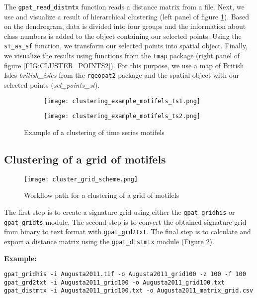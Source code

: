 The {\tt gpat\_read\_distmtx} function reads a distance matrix from a file. 
Next, we use and visualize a result of hierarchical clustering (left panel of figure \ref{FIG:CLUSTER_POINTSTS2}).
Based on the dendrogram, data is divided into four groups and the information about class numbers is added to the object containing our selected points.
Using the {\tt st\_as\_sf} function, we transform our selected points into spatial object.
Finally, we visualize the results using functions from the {\tt tmap} package (right panel of figure \ref{FIG:CLUSTER_POINTS2}).
For this purpose, we use a map of British Isles {\it british\_isles} from the {\tt rgeopat2} package and the spatial object with our selected points ({\it sel\_points\_st}).

\begin{figure}[H]
  \begin{subfigure}[b]{0.5\textwidth}
    \texttt{[image: clustering\_example\_motifels\_ts1.png]}
  \end{subfigure}
  \begin{subfigure}[b]{0.5\textwidth}
    \texttt{[image: clustering\_example\_motifels\_ts2.png]}
  \end{subfigure}
  \caption{Example of a clustering of time series motifels}
  \label{FIG:CLUSTER_POINTSTS2}
\end{figure}

\FloatBarrier

\subsection{Clustering of a grid of motifels}

\begin{figure}[H]
	\centering
	\texttt{[image: cluster\_grid\_scheme.png]}
	\caption{Workflow path for a clustering of a grid of motifels}
	\label{FIG:CLUSTER_GRID}
\end{figure}

The first step is to create a signature grid using either the {\tt gpat\_gridhis} or {\tt gpat\_gridts} module.
The second step is to convert the obtained signature grid from binary to text format with {\tt gpat\_grd2txt}.
The final step is to calculate and export a distance matrix using the {\tt gpat\_distmtx} module (Figure \ref{FIG:CLUSTER_GRID}).

{\bf Example:}

\begin{minipage}{\linewidth}
\begin{lstlisting}
gpat_gridhis -i Augusta2011.tif -o Augusta2011_grid100 -z 100 -f 100
gpat_grd2txt -i Augusta2011_grid100 -o Augusta2011_grid100.txt
gpat_distmtx -i Augusta2011_grid100.txt -o Augusta2011_matrix_grid.csv
\end{lstlisting}
\end{minipage}

